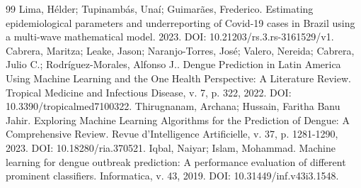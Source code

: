 \documentclass[12pt,a4paper]{article}
\begin{document}
\begin{thebibliography}{99}
 Lima, Hélder; Tupinambás, Unaí; Guimarães, Frederico. Estimating epidemiological parameters and underreporting of Covid-19 cases in Brazil using a multi-wave mathematical model. 2023. DOI: 10.21203/rs.3.rs-3161529/v1.
 Cabrera, Maritza; Leake, Jason; Naranjo-Torres, José; Valero, Nereida; Cabrera, Julio C.; Rodríguez-Morales, Alfonso J.. Dengue Prediction in Latin America Using Machine Learning and the One Health Perspective: A Literature Review. Tropical Medicine and Infectious Disease, v. 7, p. 322, 2022. DOI: 10.3390/tropicalmed7100322.
 Thirugnanam, Archana; Hussain, Faritha Banu Jahir. Exploring Machine Learning Algorithms for the Prediction of Dengue: A Comprehensive Review. Revue d'Intelligence Artificielle, v. 37, p. 1281-1290, 2023. DOI: 10.18280/ria.370521.
 Iqbal, Naiyar; Islam, Mohammad. Machine learning for dengue outbreak prediction: A performance evaluation of different prominent classifiers. Informatica, v. 43, 2019. DOI: 10.31449/inf.v43i3.1548.
\end{thebibliography}
\end{document}

